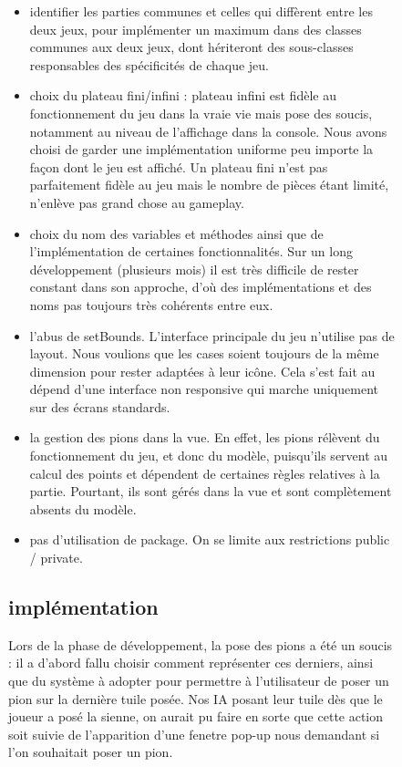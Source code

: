 \documentclass{article}
\begin{document}
\begin{figure}[t]
\begin{itemize}
  \item  identifier les parties communes et celles qui diffèrent entre les deux jeux, pour implémenter un maximum dans des classes communes aux deux jeux, dont hériteront des sous-classes responsables des spécificités de chaque jeu.
  \item choix du plateau fini/infini : plateau infini est fidèle au fonctionnement du jeu dans la vraie vie mais pose des soucis, notamment au niveau de l'affichage dans la console. Nous avons choisi de garder une implémentation uniforme peu importe la façon dont le jeu est affiché. Un plateau fini n'est pas parfaitement fidèle au jeu mais le nombre de pièces étant limité, n'enlève pas grand chose au gameplay.
  \item choix du nom des variables et méthodes ainsi que de l'implémentation de certaines fonctionnalités. Sur un long développement (plusieurs mois) il est très difficile de rester constant dans son approche, d'où des implémentations et des noms pas toujours très cohérents entre eux.
  \item l'abus de setBounds. L'interface principale du jeu n'utilise pas de layout. Nous voulions que les cases soient toujours de la même dimension pour rester adaptées à leur icône. Cela s'est fait au dépend d'une interface non responsive qui marche uniquement sur des écrans standards.
  \item la gestion des pions dans la vue. En effet, les pions rélèvent du fonctionnement du jeu, et donc du modèle, puisqu'ils servent au calcul des points et dépendent de certaines règles relatives à la partie. Pourtant, ils sont gérés dans la vue et sont complètement absents du modèle.
  \item pas d'utilisation de package. On se limite aux restrictions public / private.
\end{itemize}

\subsection{implémentation}

Lors de la phase de développement, la pose des pions a été un soucis : il a d'abord fallu choisir comment représenter ces derniers, ainsi que du système à adopter pour permettre à l'utilisateur de poser un pion sur la dernière tuile posée. Nos IA posant leur tuile dès que le joueur a posé la sienne, on aurait pu faire en sorte que cette action soit suivie de l'apparition d'une fenetre pop-up nous demandant si l'on souhaitait poser un pion. 


\end{figure}
\end{document}
